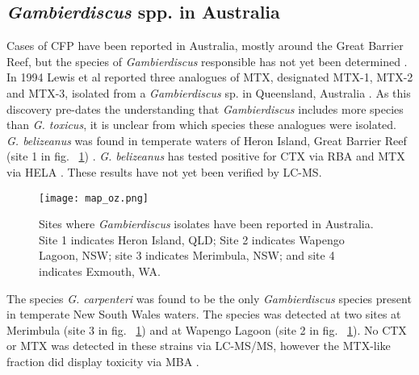 \documentclass[12pt]{article}
\begin{document}

\subsection{\emph{Gambierdiscus} spp. in Australia}
Cases of CFP have been reported in Australia, mostly around the Great Barrier Reef, but the species of \emph{Gambierdiscus} responsible has not yet been determined \cite{lewis2006ciguatera}.\\

In 1994 Lewis et al reported three analogues of MTX, designated MTX-1, MTX-2 and MTX-3, isolated from a \emph{Gambierdiscus} sp. in Queensland, Australia \cite{holmes1994purification}. As this discovery pre-dates the understanding that \emph{Gambierdiscus} includes more species than \emph{G. toxicus}, it is unclear from which species these analogues were isolated.  \\


\emph{G. belizeanus} was found in temperate waters of Heron Island, Great Barrier Reef (site 1 in fig. ~\ref{fig:OzSites}) \cite{murray2014molecular}. \emph{G. belizeanus} has tested positive for CTX via RBA \cite{chinain2010growth} and MTX via HELA \cite{holland2013differences}. These results have not yet been verified by LC-MS.\\

\begin{figure} 
\texttt{[image: map\_oz.png]}
\caption{Sites where \emph{Gambierdiscus} isolates have been reported in Australia. Site 1 indicates Heron Island, QLD; Site 2 indicates Wapengo Lagoon, NSW; site 3 indicates Merimbula, NSW; and site 4 indicates Exmouth, WA.} 
\label{fig:OzSites}
\end{figure} 
\FloatBarrier


The species \emph{G. carpenteri} was found to be the only \emph{Gambierdiscus} species present in temperate New South Wales waters. The species was detected at two sites at Merimbula (site 3 in fig. ~\ref{fig:OzSites}) and at Wapengo Lagoon (site 2 in fig. ~\ref{fig:OzSites}). No CTX or MTX was detected in these strains via LC-MS/MS, however the MTX-like fraction did display toxicity via MBA  \cite{kohli2014high}.\\ 
\end{document}
